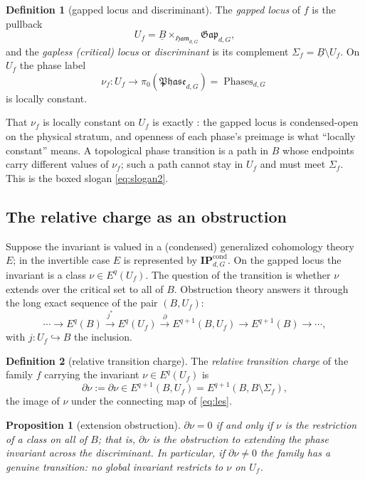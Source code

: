 \documentclass[12pt]{article}
\newcommand{\cond}[1]{\underline{#1}}          %
\newcommand{\Ham}{\mathfrak{Ham}}              %
\newcommand{\Gap}{\mathfrak{Gap}}              %
\newcommand{\Phase}{\mathfrak{Phase}}          %
\newcommand{\Phases}{\operatorname{Phases}}    %
\newcommand{\IPcond}{\mathbf{IP}^{\mathrm{cond}}}  %
\newcommand{\Sig}{\Sigma}                       %
\newcommand{\rc}{\partial\nu}                   %
\theoremstyle{plain}
\newtheorem{proposition}[proposition]{Proposition}
\theoremstyle{definition}
\newtheorem{definition}[definition]{Definition}
\theoremstyle{remark}
\begin{document}
\begin{definition}[gapped locus and discriminant]
\label{def:locus}
The \emph{gapped locus} of $f$ is the pullback
\[
U_f=\cond{B}\times_{\Ham_{d,G}}\Gap_{d,G},
\]
and the \emph{gapless (critical) locus} or \emph{discriminant} is its complement
$\Sig_f=\cond{B}\setminus U_f$. On $U_f$ the phase label
\[
\nu_f:U_f\longrightarrow\pi_0(\Phase_{d,G})=\Phases_{d,G}
\]
is locally constant.
\end{definition}

That $\nu_f$ is locally constant on $U_f$ is exactly : the gapped locus is
condensed-open on the physical stratum, and openness of each phase's preimage is what
``locally constant'' means. A topological phase transition is a path in $B$ whose
endpoints carry different values of $\nu_f$; such a path cannot stay in $U_f$ and must
meet $\Sig_f$. This is the boxed slogan \eqref{eq:slogan2}.

\subsection{The relative charge as an obstruction}
\label{sec:relcharge}

Suppose the invariant is valued in a (condensed) generalized cohomology theory $E$; in
the invertible case $E$ is represented by $\IPcond_{d,G}$. On the gapped locus the
invariant is a class $\nu\in E^q(U_f)$. The question of the transition is whether $\nu$
extends over the critical set to all of $B$. Obstruction theory answers it through the
long exact sequence of the pair $(B,U_f)$:
\begin{equation}
\label{eq:les}
\cdots\to E^q(B)\xrightarrow{\ j^\ast\ }E^q(U_f)\xrightarrow{\ \partial\ }
E^{q+1}(B,U_f)\xrightarrow{\ \ }E^{q+1}(B)\to\cdots,
\end{equation}
with $j:U_f\hookrightarrow B$ the inclusion.

\begin{definition}[relative transition charge]
\label{def:relcharge}
The \emph{relative transition charge} of the family $f$ carrying the invariant $\nu\in
E^q(U_f)$ is
\[
\rc:=\partial\nu\in E^{q+1}(B,U_f)=E^{q+1}(B,B\setminus\Sig_f),
\]
the image of $\nu$ under the connecting map of \eqref{eq:les}.
\end{definition}

\begin{proposition}[extension obstruction]
\label{prop:obstruction}
$\rc=0$ if and only if $\nu$ is the restriction of a class on all of $B$; that is,
$\rc$ is the obstruction to extending the phase invariant across the discriminant. In
particular, if $\rc\ne0$ the family has a genuine transition: no global invariant
restricts to $\nu$ on $U_f$.
\end{proposition}
\end{document}
